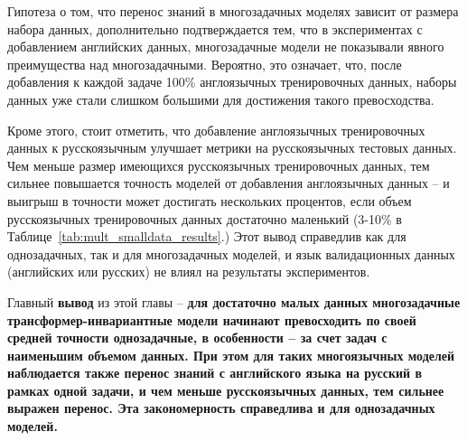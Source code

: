 
Гипотеза о том, что перенос знаний в многозадачных моделях зависит от размера набора данных, дополнительно подтверждается тем, что в экспериментах с добавлением английских данных, многозадачные модели не показывали явного преимущества над многозадачными. Вероятно, это означает, что, после добавления к каждой задаче 100\% англоязычных тренировочных данных, наборы данных уже стали слишком большими для достижения такого превосходства.

Кроме этого, стоит отметить, что добавление англоязычных тренировочных данных к русскоязычным улучшает метрики на русскоязычных тестовых данных. Чем меньше размер имеющихся русскоязычных тренировочных данных, тем сильнее повышается точность моделей от добавления англоязычных данных -- и выигрыш в точности может достигать нескольких процентов, если объем русскоязычных тренировочных данных достаточно маленький (3-10\% в Таблице~\ref{tab:mult_smalldata_results}.) Этот вывод справедлив как для однозадачных, так и для многозадачных моделей, и язык валидационных данных (английских или русских) не влиял на результаты экспериментов.

Главный \textbf{вывод} из этой главы -- \textbf{для достаточно малых данных многозадачные трансформер-инвариантные модели начинают превосходить по своей средней точности однозадачные, в особенности -- за счет задач с наименьшим объемом данных. При этом для таких многоязычных моделей наблюдается также перенос знаний с английского языка на русский в рамках одной задачи, и чем меньше русскоязычных данных, тем сильнее выражен перенос. Эта закономерность справедлива и для однозадачных моделей.}

